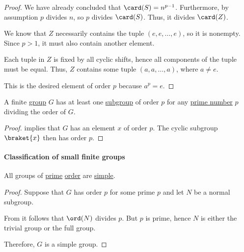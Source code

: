 \begin{proof}
  We have already concluded that \( \card(S) = n^{p-1} \). Furthermore, by assumption \( p \) divides \( n \), so \( p \) divides \( \card(S) \). Thus, it divides \( \card(Z) \).

  We know that \( Z \) necessarily contains the tuple \( (e, e, \ldots, e) \), so it is nonempty. Since \( p > 1 \), it must also contain another element.

  Each tuple in \( Z \) is fixed by all cyclic shifts, hence all components of the tuple must be equal. Thus, \( Z \) contains some tuple \( (a, a, \ldots, a) \), where \( a \neq e \).

  This is the desired element of order \( p \) because \( a^p = e \).
\end{proof}

\begin{corollary}\label{thm:weak_cauchys_subgroup_theorem}
  A finite \hyperref[def:group]{group} \( G \) has at least one \hyperref[def:group/subobject]{subgroup} of order \( p \) for any \hyperref[def:prime_number]{prime number} \( p \) dividing the order of \( G \).
\end{corollary}
\begin{proof}
   implies that \( G \) has an element \( x \) of order \( p \). The cyclic subgroup \( \braket{ x } \) then has order \( p \).
\end{proof}

\paragraph{Classification of small finite groups}

\begin{proposition}\label{thm:prime_groups_are_simple}
  All groups of \hyperref[def:prime_number]{prime} \hyperref[def:group_order]{order} are \hyperref[def:simple_group]{simple}.
\end{proposition}
\begin{proof}
  Suppose that \( G \) has order \( p \) for some prime \( p \) and let \( N \) be a normal subgroup.

  From  it follows that \( \ord(N) \) divides \( p \). But \( p \) is prime, hence \( N \) is either the trivial group or the full group.

  Therefore, \( G \) is a simple group.
\end{proof}

